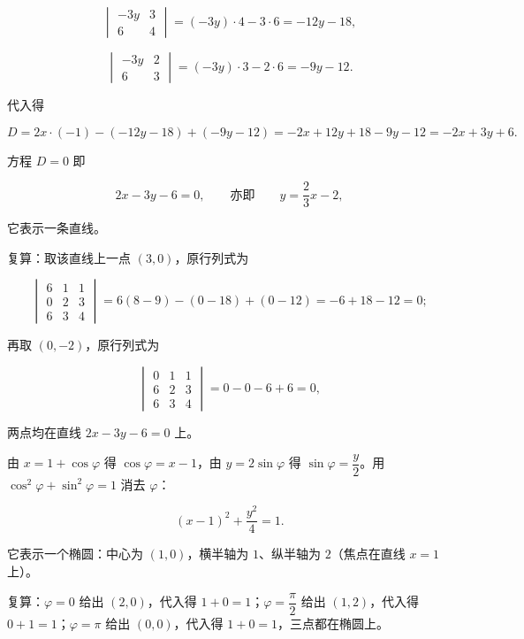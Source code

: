 \begin{answer}
\nopagebreak[4]
\[
\begin{vmatrix}-3y&3\\6&4\end{vmatrix}=(-3y)\cdot4-3\cdot6=-12y-18,
\]

\nopagebreak[4]
\[
\begin{vmatrix}-3y&2\\6&3\end{vmatrix}=(-3y)\cdot3-2\cdot6=-9y-12.
\]

代入得

\nopagebreak[4]
\[
D=2x\cdot(-1)-(-12y-18)+(-9y-12)
=-2x+12y+18-9y-12
=-2x+3y+6.
\]

方程 $D=0$ 即

\nopagebreak[4]
\[
2x-3y-6=0,\qquad\text{亦即}\qquad y=\frac23x-2,
\]

它表示一条直线。

复算：取该直线上一点 $(3,0)$，原行列式为

\nopagebreak[4]
\[
\begin{vmatrix}6&1&1\\0&2&3\\6&3&4\end{vmatrix}
=6(8-9)-(0-18)+(0-12)=-6+18-12=0;
\]

再取 $(0,-2)$，原行列式为

\nopagebreak[4]
\[
\begin{vmatrix}0&1&1\\6&2&3\\6&3&4\end{vmatrix}
=0-0-6+6=0,
\]

两点均在直线 $2x-3y-6=0$ 上。


由 $x=1+\cos\varphi$ 得 $\cos\varphi=x-1$，由 $y=2\sin\varphi$ 得 $\sin\varphi=\dfrac y2$。用 $\cos^2\varphi+\sin^2\varphi=1$ 消去 $\varphi$：

\nopagebreak[4]
\[
(x-1)^2+\frac{y^2}{4}=1.
\]

它表示一个椭圆：中心为 $(1,0)$，横半轴为 $1$、纵半轴为 $2$（焦点在直线 $x=1$ 上）。

复算：$\varphi=0$ 给出 $(2,0)$，代入得 $1+0=1$；$\varphi=\dfrac\pi2$ 给出 $(1,2)$，代入得 $0+1=1$；$\varphi=\pi$ 给出 $(0,0)$，代入得 $1+0=1$，三点都在椭圆上。



\end{answer}
